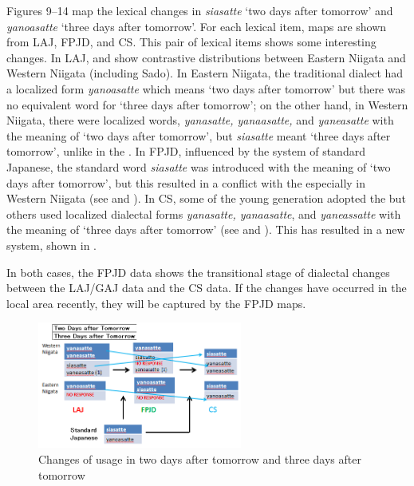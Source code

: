 \documentclass[output=paper]{LSP/langsci}
\begin{document}
Figures 9--14 map the lexical changes in \textit{siasatte} `two days after tomorrow' and \textit{yanoasatte} `three days after tomorrow'.  For each lexical item, maps are shown from \textsc{LAJ}, \textsc{FPJD}, and \textsc{CS}. This pair of lexical items shows some interesting changes.  In \textsc{LAJ},  and  show contrastive distributions between Eastern Niigata and Western Niigata (including Sado).  In Eastern Niigata, the traditional dialect had a localized form \textit{yanoasatte} which means `two days after tomorrow' but there was no equivalent word for `three days after tomorrow'; on the other hand, in Western Niigata, there were localized words, \textit{yanasatte, yanaasatte,} and \textit{yaneasatte} with the meaning of `two days after tomorrow', but \textit{siasatte} meant `three days after tomorrow', unlike in the . In \textsc{FPJD}, influenced by the system of standard Japanese, the standard word \textit{siasatte} was introduced with the meaning of `two days after tomorrow', but this resulted in a conflict with the  especially in Western Niigata (see  and ).  In \textsc{CS}, some of the young generation adopted the  but others used localized dialectal forms \textit{yanasatte, yanaasatte}, and \textit{yaneassatte} with the meaning of `three days after tomorrow' (see  and ). This has resulted in a new system, shown in .

In both cases, the \textsc{FPJD} data shows the transitional stage of dialectal changes between the \textsc{LAJ}/\textsc{GAJ} data and the \textsc{CS} data. If the changes have occurred in the local area recently, they will be captured by the \textsc{FPJD} maps.

\begin{figure}
\includegraphics[width=0.6\textwidth]{illustrations/fuku2_fig7}
\caption{Changes of usage in {\textquotedbl}two days after tomorrow{\textquotedbl} and {\textquotedbl}three days after tomorrow{\textquotedbl}}
\label{fig:7}
\end{figure}
\end{document}
